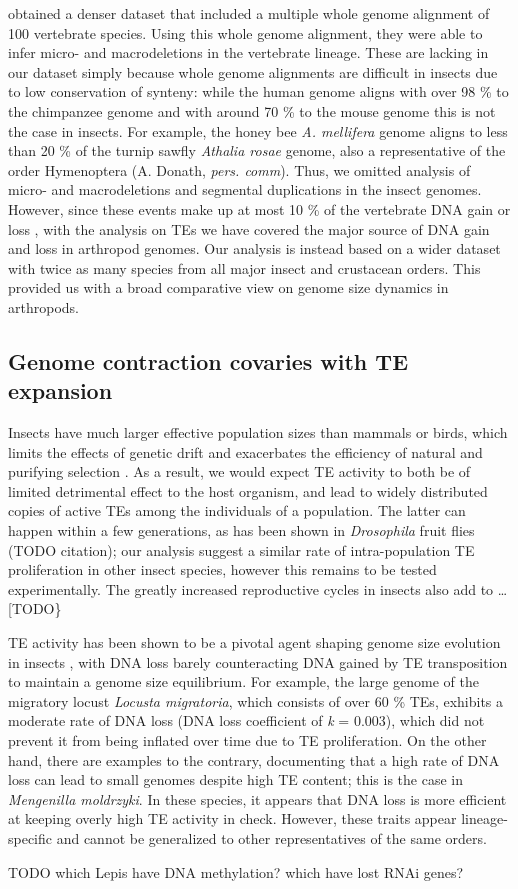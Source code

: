 \citet{Kapusta2017a} obtained a denser dataset that included a
multiple whole genome alignment of 100 vertebrate species. Using this
whole genome alignment, they were able to infer micro- and
macrodeletions in the vertebrate lineage. These are lacking in our
dataset simply because whole genome alignments are difficult in insects
due to low conservation of synteny: while the human genome aligns with
over 98 \% to the chimpanzee genome and with around 70 \% to the mouse
genome \cite{Mural2002} this is not the case in insects. For example,
the honey bee \emph{A. mellifera} genome aligns to less than 20 \% of
the turnip sawfly \emph{Athalia rosae} genome, also a representative of
the order Hymenoptera (A. Donath, \emph{pers. comm}). Thus, we omitted
analysis of micro- and macrodeletions and segmental duplications in the
insect genomes. However, since these events make up at most 10 \% of the
vertebrate DNA gain or loss \citep{Kapusta2017a}, with the analysis on
TEs we have covered the major source of DNA gain and loss in arthropod
genomes. Our analysis is instead based on a wider dataset with twice as
many species from all major insect and crustacean orders. This provided
us with a broad comparative view on genome size dynamics in arthropods.

\subsection{Genome contraction covaries with TE
expansion}\label{genome-contraction-covaries-with-te-expansion}

Insects have much larger effective population sizes than mammals or
birds, which limits the effects of genetic drift and exacerbates the
efficiency of natural and purifying selection \citep{Szitenberg2016}. As a
result, we would expect TE activity to both be of limited detrimental
effect to the host organism, and lead to widely distributed copies of
active TEs among the individuals of a population. The latter can happen
within a few generations, as has been shown in \emph{Drosophila} fruit
flies (TODO citation); our analysis suggest a similar rate of
intra-population TE proliferation in other insect species, however this
remains to be tested experimentally. The greatly increased reproductive
cycles in insects also add to \ldots{} {[}TODO\}

TE activity has been shown to be a pivotal agent shaping genome size
evolution in insects \citep{Maumus2015}, with DNA loss barely
counteracting DNA gained by TE transposition to maintain a genome size
equilibrium. For example, the large genome of the migratory locust
\emph{Locusta migratoria}, which consists of over 60 \% TEs, exhibits a
moderate rate of DNA loss (DNA loss coefficient of \emph{k} = 0.003),
which did not prevent it from being inflated over time due to TE
proliferation. On the other hand, there are examples to the contrary,
documenting that a high rate of DNA loss can lead to small genomes
despite high TE content; this is the case in \emph{Mengenilla
moldrzyki}. In these species, it appears that DNA loss is more efficient
at keeping overly high TE activity in check. However, these traits
appear lineage-specific and cannot be generalized to other
representatives of the same orders.

TODO which Lepis have DNA methylation? which have lost RNAi genes?



